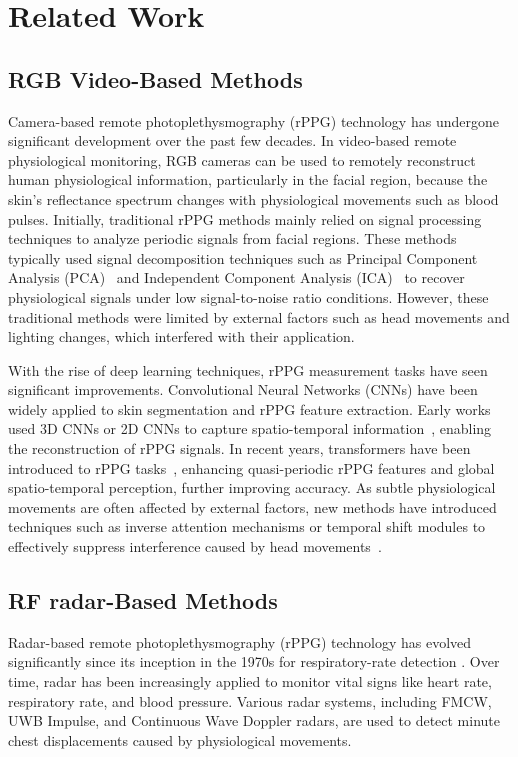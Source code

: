 \section{Related Work}
\label{sec:relatedwork}

\subsection{RGB Video-Based Methods}

Camera-based remote photoplethysmography (rPPG) technology has undergone significant development over the past few decades. In video-based remote physiological monitoring, RGB cameras can be used to remotely reconstruct human physiological information, particularly in the facial region, because the skin’s reflectance spectrum changes with physiological movements such as blood pulses. Initially, traditional rPPG methods mainly relied on signal processing techniques to analyze periodic signals from facial regions. These methods typically used signal decomposition techniques such as Principal Component Analysis (PCA)~\cite{balakrishnan2013detecting} and Independent Component Analysis (ICA)~\cite{poh2010noncontact,monkaresi2014machine} to recover physiological signals under low signal-to-noise ratio conditions. However, these traditional methods were limited by external factors such as head movements and lighting changes, which interfered with their application.

With the rise of deep learning techniques, rPPG measurement tasks have seen significant improvements. Convolutional Neural Networks (CNNs) have been widely applied to skin segmentation and rPPG feature extraction. Early works used 3D CNNs or 2D CNNs to capture spatio-temporal information~\cite{poh2010noncontact,yu2019remote,wang2019vision,chen2018deepphys}, enabling the reconstruction of rPPG signals. In recent years, transformers have been introduced to rPPG tasks~\cite{yu2022physformer,zou2024rhythmformer,yu2023physformer++}, enhancing quasi-periodic rPPG features and global spatio-temporal perception, further improving accuracy. As subtle physiological movements are often affected by external factors, new methods have introduced techniques such as inverse attention mechanisms or temporal shift modules to effectively suppress interference caused by head movements~\cite{nowara2021benefit}.

\vspace{-0.8em}
\subsection{RF radar-Based Methods}
Radar-based remote photoplethysmography (rPPG) technology has evolved significantly since its inception in the 1970s for respiratory-rate detection \cite{lin1975noninvasive}. Over time, radar has been increasingly applied to monitor vital signs like heart rate, respiratory rate, and blood pressure. Various radar systems, including FMCW, UWB Impulse, and Continuous Wave Doppler radars, are used to detect minute chest displacements caused by physiological movements.


